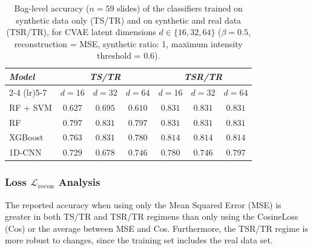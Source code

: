 \documentclass[12pt]{article}
\theoremstyle{paper}
\begin{document}
\begin{table}[H]
\centering
\small
\begin{tabular*}{\textwidth}{@{\extracolsep{\fill}}lcccccc}
\toprule
\multirow{2}{*}{\emph{Model}} & \multicolumn{3}{c}{\emph{TS/TR}} & \multicolumn{3}{c}{\emph{TSR/TR}} \\
\cmidrule(lr){2-4} \cmidrule(lr){5-7}
 & $d=16$ & $d=32$ & $d=64$ & $d=16$ & $d=32$ & $d=64$ \\
\midrule
RF + SVM & $0.627$ & $0.695$ & $0.610$ & $0.831$ & $0.831$ & $0.831$ \\
RF & $0.797$ & $0.831$ & $0.797$ & $0.831$ & $0.831$ & $0.831$ \\
XGBoost & $0.763$ & $0.831$ & $0.780$ & $0.814$ & $0.814$ & $0.814$ \\
1D-CNN & $0.729$ & $0.678$ & $0.746$ & $0.780$ & $0.746$ & $0.797$ \\
\bottomrule
\end{tabular*}
\caption{\small Bag-level accuracy ($n=59$ slides) of the classifiers trained on synthetic data only (TS/TR) and on synthetic and real data (TSR/TR), for CVAE latent dimensions $d \in \{16, 32, 64\}$ ($\beta=0.5$, reconstruction = MSE, synthetic ratio: 1, maximum intensity threshold = 0.6).}
\label{tab:latent_dim_results}
\end{table}


\subsubsection{Loss $\mathcal{L}_{\text{recon}}$ Analysis}

The reported accuracy when using only the Mean Squared Error (MSE) is greater in both TS/TR and TSR/TR regimens than only using the CosineLoss (Cos) or the average between MSE and Cos. Furthermore, the TSR/TR regime is more robust to changes, since the training set includes the real data set.

\end{document}
